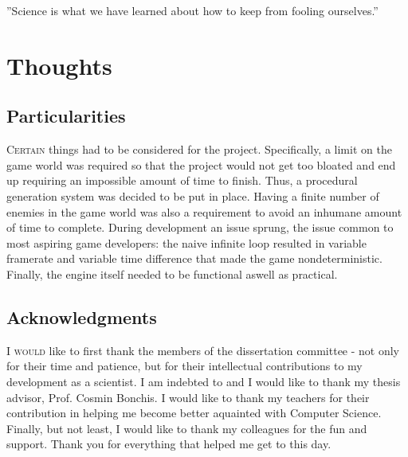 \begin{savequote}[75mm] 
”Science is what we have learned about how to keep from fooling ourselves.”
\end{savequote}

\chapter{Thoughts}
\section{Particularities}
\lettrine[lines=1]{\color{Crimson}C}{ertain} things had to be considered for the project. Specifically, a limit on the game world was required so that the project would not get too bloated and end up requiring an impossible amount of time to finish. Thus, a procedural generation system was decided to be put in place. Having a finite number of enemies in the game world was also a requirement to avoid an inhumane amount of time to complete. During development an issue sprung, the issue common to most aspiring game developers: the naive infinite loop resulted in variable framerate and variable time difference that made the game nondeterministic.\cite{Fabien2012} Finally, the engine itself needed to be functional aswell as practical.
\section{Acknowledgments}
\lettrine[lines=1]{\color{Crimson}I}{ would} like to first thank the members of the dissertation committee - not only for their time and patience, but for their intellectual contributions to my development as a scientist. I am indebted to and I would like to thank my thesis advisor, Prof. Cosmin Bonchis. I would like to thank my teachers for their contribution in helping me become better aquainted with Computer Science. Finally, but not least, I would like to thank my colleagues for the fun and support. Thank you for everything that helped me get to this day.
\afterpage{\clearpage}